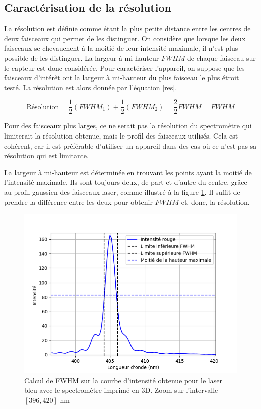 \documentclass[11pt,letterpaper]{article}
\begin{document}

\subsection{Caractérisation de la résolution}

La résolution est définie comme étant la plus petite distance entre les centres de deux
faisceaux qui permet de les distinguer. On considère que lorsque les deux faisceaux se 
chevauchent à la moitié de leur intensité maximale, il n'est plus possible de les distinguer.
La largeur à mi-hauteur $FWHM$ de chaque faisceau sur le capteur est donc considérée. Pour 
caractériser l'appareil, on suppose que les faisceaux d'intérêt ont la largeur à mi-hauteur
du plus faisceau le plus étroit testé. La résolution est alors donnée par l'équation \ref{res}.

\begin{equation}\label{res}
  \text{Résolution} = \frac{1}{2}(FWHM_1)+\frac{1}{2}(FWHM_2)=\frac{2}{2}FWHM=FWHM
\end{equation}

Pour des faisceaux plus larges, ce ne serait pas la 
résolution du spectromètre qui limiterait la résolution obtenue, mais le profil des faisceaux
utilisés. Cela est cohérent, car il est préférable d'utiliser un appareil dans des cas où 
ce n'est pas sa résolution qui est limitante. 

La largeur à mi-hauteur est déterminée en trouvant les points ayant la moitié de l'intensité 
maximale. Ils sont toujours deux, de part et d'autre du centre, grâce au profil gaussien
des faisceaux laser, comme illustré à la figure \ref{FWHM_bleu}. Il suffit de prendre la 
différence entre les deux pour obtenir $FWHM$ et, donc, la résolution. 

\begin{figure}[h!]
  \centering
  \includegraphics[width=0.8\linewidth]{FWHM_bleu_3D.png}
  \caption{Calcul de FWHM sur la courbe d'intensité obtenue pour le laser bleu avec le spectromètre imprimé en 3D. Zoom sur l'intervalle $[396, 420]$ nm}
  \label{FWHM_bleu}
\end{figure}
\end{document}
